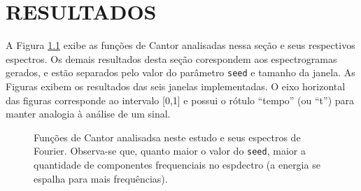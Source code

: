 

\chapter{RESULTADOS}

A Figura \ref{fig:resume} exibe as funções de Cantor analisadas nessa seção e seus respectivos espectros. Os demais resultados desta seção corespondem aos espectrogramas gerados, e estão separados pelo valor do parâmetro \texttt{seed} e tamanho da janela. As Figuras exibem os resultados das seis janelas implementadas. O eixo horizontal das figuras corresponde ao intervalo [0,1] e possui o rótulo ``tempo'' (ou ``t'') para manter analogia à análise de um sinal.

\begin{figure}[ht!]
	\vspace{1mm}	
	\begin{center}
	\end{center}
	\vspace{1mm}	
	\caption{Funções de Cantor analisadsa neste estudo e seus espectros de Fourier. Observa-se que, quanto maior o valor do \texttt{seed}, maior a quantidade de componentes frequenciais no espdectro (a energia se espalha para mais frequências).}
	\label{fig:resume}
\end{figure}

